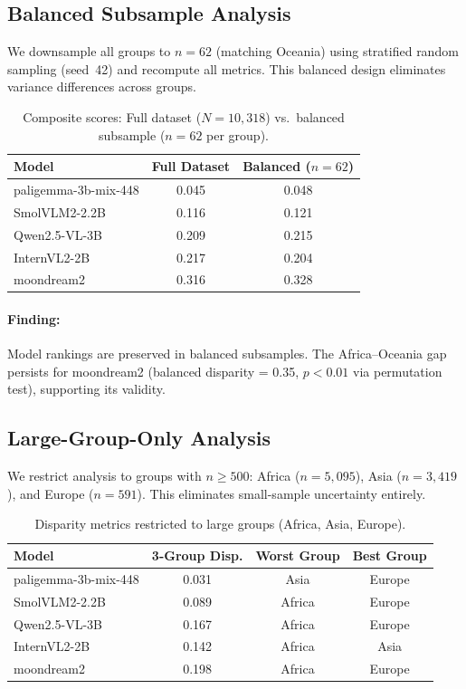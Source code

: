 \documentclass{article}
\begin{document}
\subsection{Balanced Subsample Analysis}

We downsample all groups to $n=62$ (matching Oceania) using stratified random sampling (seed~42) and recompute all metrics. This balanced design eliminates variance differences across groups.

\begin{table}[h]
\centering
\caption{Composite scores: Full dataset ($N=10{,}318$) vs.\ balanced subsample ($n=62$ per group).}
\small
\begin{tabular}{lcc}
\toprule
\textbf{Model} & \textbf{Full Dataset} & \textbf{Balanced ($n=62$)} \\
\midrule
paligemma-3b-mix-448 & 0.045 & 0.048 \\
SmolVLM2-2.2B & 0.116 & 0.121 \\
Qwen2.5-VL-3B & 0.209 & 0.215 \\
InternVL2-2B & 0.217 & 0.204 \\
moondream2 & 0.316 & 0.328 \\
\bottomrule
\end{tabular}
\end{table}

\paragraph{Finding:} Model rankings are preserved in balanced subsamples. The Africa--Oceania gap persists for moondream2 (balanced disparity = 0.35, $p < 0.01$ via permutation test), supporting its validity.

\subsection{Large-Group-Only Analysis}

We restrict analysis to groups with $n \geq 500$: Africa ($n=5{,}095$), Asia ($n=3{,}419$), and Europe ($n=591$). This eliminates small-sample uncertainty entirely.

\begin{table}[h]
\centering
\caption{Disparity metrics restricted to large groups (Africa, Asia, Europe).}
\small
\begin{tabular}{lccc}
\toprule
\textbf{Model} & \textbf{3-Group Disp.} & \textbf{Worst Group} & \textbf{Best Group} \\
\midrule
paligemma-3b-mix-448 & 0.031 & Asia & Europe \\
SmolVLM2-2.2B & 0.089 & Africa & Europe \\
Qwen2.5-VL-3B & 0.167 & Africa & Europe \\
InternVL2-2B & 0.142 & Africa & Asia \\
moondream2 & 0.198 & Africa & Europe \\
\bottomrule
\end{tabular}
\end{table}
\end{document}
